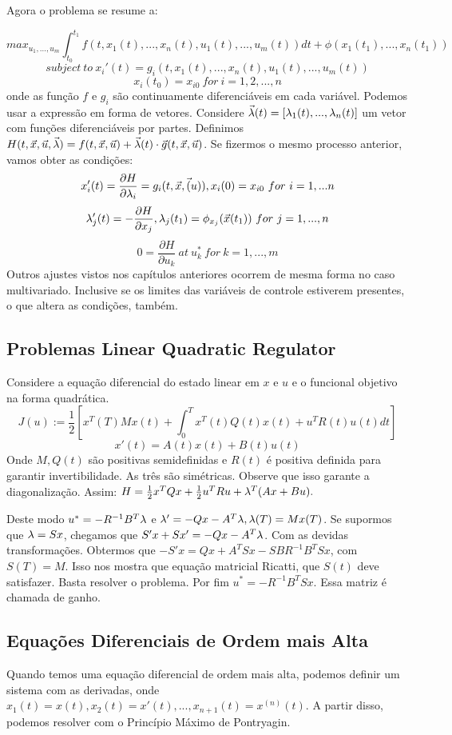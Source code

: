 Agora o problema se resume a:

$$
max_{u_1,...,u_m} \int_{t_0}^{t_1} f(t,x_1(t),...,x_n(t),u_1(t),...,u_m(t)) dt + \phi(x_1(t_1),...,x_n(t_1))
$$
$$
subject~to~x_i'(t) = g_i(t,x_1(t),...,x_n(t),u_1(t),...,u_m(t))
$$
$$
x_i(t_0) = x_{i0}~for~i=1,2,...,n
$$
onde as função $f$ e $g_i$ são continuamente diferenciáveis em cada variável. Podemos usar a expressão em forma de vetores. Considere $\Vec{\lambda}(t) = [\lambda_1(t),...,\lambda_n(t)]$ um vetor com funções diferenciáveis por partes. Definimos $H(t,\Vec{x},\Vec{u},\Vec{\lambda}) = f(t,\Vec{x},\Vec{u}) + \Vec{\lambda}(t)\cdot \Vec{g}(t,\Vec{x},\Vec{u})$. Se fizermos o mesmo processo anterior, vamos obter as condições:
$$
x'_i(t) = \frac{\partial H}{\partial \lambda_i} = g_i(t,\Vec{x},\Vec(u)), x_i(0) = x_{i0}~for~i = 1,...n 
$$
$$
\lambda'_j(t) = - \frac{\partial H}{\partial x_j}, \lambda_j(t_1) = \phi_{x_j}(\Vec{x}(t_1))~for~j=1,...,n
$$
$$
0 = \frac{\partial H}{\partial u_k}~at~u^*_k~for~k=1,...,m
$$
Outros ajustes vistos nos capítulos anteriores ocorrem de mesma forma no caso multivariado. Inclusive se os limites das variáveis de controle estiverem presentes, o que altera as condições, também. 

\subsection{Problemas Linear Quadratic Regulator}

Considere a equação diferencial do estado linear em $x$ e $u$ e o funcional objetivo na forma quadrática. 
$$
J(u) := \frac{1}{2}[x^T(T)Mx(t) + \int_0^T x^T(t)Q(t)x(t) + u^TR(t)u(t) dt]
$$
$$
x'(t) = A(t)x(t) + B(t)u(t)
$$
Onde $M, Q(t)$ são positivas semidefinidas e $R(t)$ é positiva definida para garantir invertibilidade. As três são simétricas. Observe que isso garante a diagonalização.
Assim: $H = \frac{1}{2}x^TQx + \frac{1}{2}u^TRu + \lambda^T(Ax + Bu).$ 

Deste modo $u^* = - R^{-1}B^T\lambda$ e $\lambda' = -Qx - A^T\lambda, \lambda(T) = Mx(T)$. Se supormos que $\lambda = Sx$, chegamos que $S'x + Sx' = -Qx - A^T\lambda$. Com as devidas transformações. Obtermos que $-S'x = Qx + A^TSx - SBR^{-1}B^TSx$, com $S(T) = M$. Isso nos mostra que equação matricial Ricatti, que $S(t)$ deve satisfazer. Basta resolver o problema. Por fim $u^* = -R^{-1}B^TSx$. Essa matriz é chamada de ganho. 

\subsection{Equações Diferenciais de Ordem mais Alta}
Quando temos uma equação diferencial de ordem mais alta, podemos definir um sistema com as derivadas, onde $x_1(t) = x(t), x_2(t) = x'(t), ..., x_{n+1}(t) = x^{(n)}(t)$. A partir disso, podemos resolver com o Princípio Máximo de Pontryagin. 

